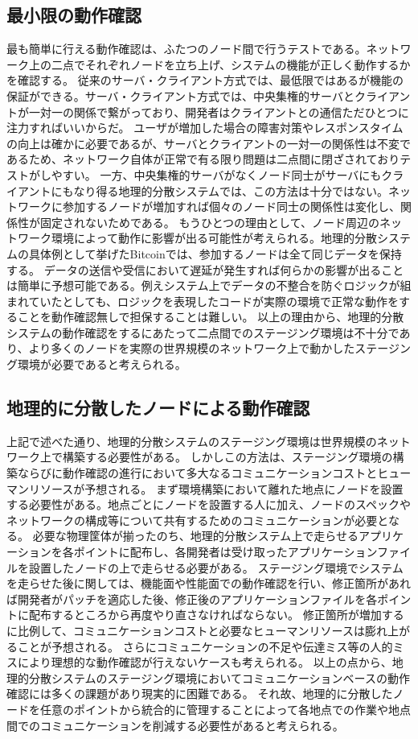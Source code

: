 \subsection{最小限の動作確認}
最も簡単に行える動作確認は、ふたつのノード間で行うテストである。ネットワーク上の二点でそれぞれノードを立ち上げ、システムの機能が正しく動作するかを確認する。
従来のサーバ・クライアント方式では、最低限ではあるが機能の保証ができる。サーバ・クライアント方式では、中央集権的サーバとクライアントが一対一の関係で繋がっており、開発者はクライアントとの通信ただひとつに注力すればいいからだ。
ユーザが増加した場合の障害対策やレスポンスタイムの向上は確かに必要であるが、サーバとクライアントの一対一の関係性は不変であるため、ネットワーク自体が正常で有る限り問題は二点間に閉ざされておりテストがしやすい。
一方、中央集権的サーバがなくノード同士がサーバにもクライアントにもなり得る地理的分散システムでは、この方法は十分ではない。ネットワークに参加するノードが増加すれば個々のノード同士の関係性は変化し、関係性が固定されないためである。
もうひとつの理由として、ノード周辺のネットワーク環境によって動作に影響が出る可能性が考えられる。地理的分散システムの具体例として挙げたBitcoinでは、参加するノードは全て同じデータを保持する。
データの送信や受信において遅延が発生すれば何らかの影響が出ることは簡単に予想可能である。例えシステム上でデータの不整合を防ぐロジックが組まれていたとしても、ロジックを表現したコードが実際の環境で正常な動作をすることを動作確認無しで担保することは難しい。
以上の理由から、地理的分散システムの動作確認をするにあたって二点間でのステージング環境は不十分であり、より多くのノードを実際の世界規模のネットワーク上で動かしたステージング環境が必要であると考えられる。

\subsection{地理的に分散したノードによる動作確認}
上記で述べた通り、地理的分散システムのステージング環境は世界規模のネットワーク上で構築する必要性がある。
しかしこの方法は、ステージング環境の構築ならびに動作確認の進行において多大なるコミュニケーションコストとヒューマンリソースが予想される。
まず環境構築において離れた地点にノードを設置する必要性がある。地点ごとにノードを設置する人に加え、ノードのスペックやネットワークの構成等について共有するためのコミュニケーションが必要となる。
必要な物理筐体が揃ったのち、地理的分散システム上で走らせるアプリケーションを各ポイントに配布し、各開発者は受け取ったアプリケーションファイルを設置したノードの上で走らせる必要がある。
ステージング環境でシステムを走らせた後に関しては、機能面や性能面での動作確認を行い、修正箇所があれば開発者がパッチを適応した後、修正後のアプリケーションファイルを各ポイントに配布するところから再度やり直さなければならない。
修正箇所が増加するに比例して、コミュニケーションコストと必要なヒューマンリソースは膨れ上がることが予想される。
さらにコミュニケーションの不足や伝達ミス等の人的ミスにより理想的な動作確認が行えないケースも考えられる。
以上の点から、地理的分散システムのステージング環境においてコミュニケーションベースの動作確認には多くの課題があり現実的に困難である。
それ故、地理的に分散したノードを任意のポイントから統合的に管理することによって各地点での作業や地点間でのコミュニケーションを削減する必要性があると考えられる。

